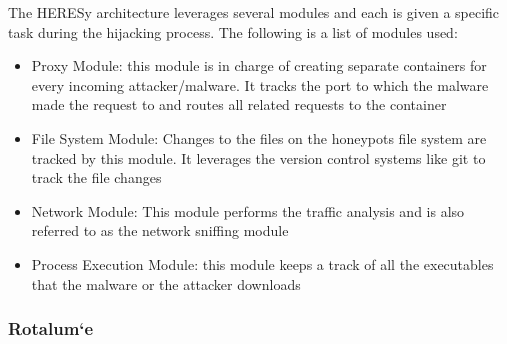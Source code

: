 \documentclass[11pt]{article}
\begin{document}
		The HERESy architecture leverages several modules and each is given a specific task during the hijacking process. The following is a list of modules used:
		\begin{itemize}
			\item Proxy Module: this module is in charge of creating separate containers for every incoming attacker/malware. It tracks the port to which the malware made the request to and routes all related requests to the container
			\item File System Module: Changes to the files on the honeypots file system are tracked by this module. It leverages the version control systems like git to track the file changes
			\item Network Module: This module performs the traffic analysis and is also referred to as the network sniffing module
			\item Process Execution Module: this module keeps a track of all the executables that the malware or the attacker downloads
		\end{itemize}
		
		
		
		\subsubsection{Rotalum`e}
		
\end{document}
